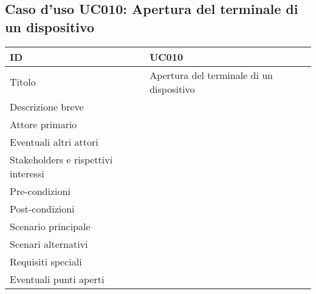 \documentclass[../../main.tex]{subfiles}
\begin{document}
\subsection{Caso d’uso UC010: Apertura del terminale di un dispositivo }
\begin{tabularx}{150mm}{|l|X|}
    \hline
    ID                                  & \textbf{UC010}\\
    \hline
    Titolo                              & Apertura del terminale di un dispositivo \\
    \hline
    Descrizione breve                   &    \\
    \hline
    Attore primario                     &    \\
    \hline
    Eventuali altri attori              &    \\
    \hline
    Stakeholders e rispettivi interessi &    \\
    \hline
    Pre-condizioni                      &    \\
    \hline
    Post-condizioni                     &    \\
    \hline
    Scenario principale                 &    \\
    \hline
    Scenari alternativi                 &    \\
    \hline
    Requisiti speciali                  &    \\
    \hline
    Eventuali punti aperti              &    \\
    \hline
\end{tabularx}
\newpage
\end{document}
